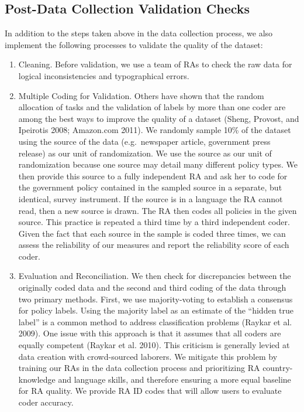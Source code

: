 \documentclass[]{article}
\begin{document}
\hypertarget{post-data-collection-validation-checks}{%
\subsection{Post-Data Collection Validation Checks}\label{post-data-collection-validation-checks}}

In addition to the steps taken above in the data collection process, we also implement the following processes to validate the quality of the dataset:

\begin{enumerate}
\def\labelenumi{\arabic{enumi}.}
\item
  Cleaning. Before validation, we use a team of RAs to check the raw data for logical inconsistencies and typographical errors.
\item
  Multiple Coding for Validation. Others have shown that the random allocation of tasks and the validation of labels by more than one coder are among the best ways to improve the quality of a dataset (Sheng, Provost, and Ipeirotis 2008; Amazon.com 2011). We randomly sample 10\% of the dataset using the source of the data (e.g.~newspaper article, government press release) as our unit of randomization. We use the source as our unit of randomization because one source may detail many different policy types. We then provide this source to a fully independent RA and ask her to code for the government policy contained in the sampled source in a separate, but identical, survey instrument. If the source is in a language the RA cannot read, then a new source is drawn. The RA then codes all policies in the given source. This practice is repeated a third time by a third independent coder. Given the fact that each source in the sample is coded three times, we can assess the reliability of our measures and report the reliability score of each coder.
\item
  Evaluation and Reconciliation. We then check for discrepancies between the originally coded data and the second and third coding of the data through two primary methods. First, we use majority-voting to establish a consensus for policy labels. Using the majority label as an estimate of the ``hidden true label'' is a common method to address classification problems (Raykar et al. 2009). One issue with this approach is that it assumes that all coders are equally competent (Raykar et al. 2010). This criticism is generally levied at data creation with crowd-sourced laborers. We mitigate this problem by training our RAs in the data collection process and prioritizing RA country-knowledge and language skills, and therefore ensuring a more equal baseline for RA quality. We provide RA ID codes that will allow users to evaluate coder accuracy.
\end{enumerate}
\end{document}
